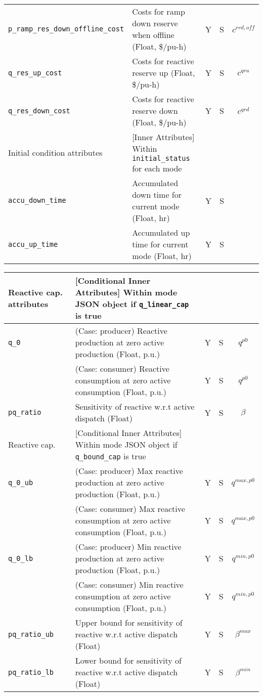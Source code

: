 \documentclass{article}
\begin{document}
\begin{center}
\begin{tabular}{ l | l | c | c | c |}
  {\tt p\_ramp\_res\_down\_offline\_cost}  & Costs for ramp down reserve when offline (Float, \$/pu-h) & Y & S & $c^{rrd, off}$\\     
  {\tt q\_res\_up\_cost} & Costs for reactive reserve up (Float, \$/pu-h) & Y & S & $c^{qru}$\\ 
  {\tt q\_res\_down\_cost} & Costs for reactive reserve down (Float, \$/pu-h) & Y & S & $c^{qrd}$\\ 
   \hline
  \hline
  Initial condition attributes & [Inner Attributes] Within {\tt initial\_status} for each mode &  &  & \\
  \hline
  {\tt accu\_down\_time} & Accumulated down time for current mode (Float, hr) & Y & S & \\  
  {\tt accu\_up\_time} & Accumulated up time for current mode (Float, hr) & Y & S & \\    
  \hline    
   
\end{tabular}
\end{center}

\begin{center}
\small
\begin{tabular}{ l | l | c | c | c |}
 \hline
  Reactive cap. attributes & [Conditional Inner Attributes] Within mode JSON object if {\tt q\_linear\_cap} is true &  &  & \\
  \hline
  {\tt q\_0}               & { (Case: producer) Reactive production at zero active production (Float, p.u.) }& Y & S & $q^{p0}$\\
                           & { (Case: consumer) Reactive consumption at zero active consumption (Float, p.u.) }& Y & S & $q^{p0}$\\
  {\tt pq\_ratio}          & Sensitivity of reactive w.r.t active dispatch (Float) & Y & S & $\beta$\\
  \hline \hline
  Reactive cap. & [Conditional Inner Attributes] Within mode JSON object if {\tt q\_bound\_cap} is true &  &  & \\
  \hline
  {\tt q\_0\_ub}           & { (Case: producer) Max reactive production at zero active production (Float, p.u.)} & Y & S & $q^{max,p0}$\\
                           & { (Case: consumer) Max reactive consumption at zero active consumption (Float, p.u.)} & Y & S & $q^{max,p0}$\\
  {\tt q\_0\_lb}           & { (Case: producer) Min reactive production at zero active production (Float, p.u.)} & Y & S & $q^{min,p0}$\\
                           & { (Case: consumer) Min reactive consumption at zero active consumption (Float, p.u.)} & Y & S & $q^{min,p0}$\\
  {\tt pq\_ratio\_ub}      & Upper bound for sensitivity of reactive w.r.t active dispatch (Float) & Y & S & $\beta^{max}$\\
  {\tt pq\_ratio\_lb}      & Lower bound for sensitivity of reactive w.r.t active dispatch (Float) & Y & S & $\beta^{min}$\\
  \hline 
\end{tabular}
\end{center}
\end{document}

